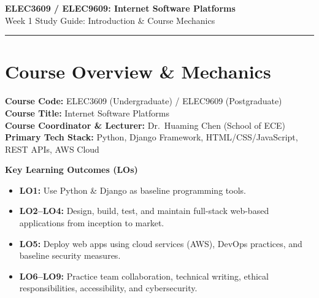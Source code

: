 \documentclass[8pt, a4paper]{article}
\begin{document}
\begin{center}
  {\LARGE\bfseries\color{accentblue} ELEC3609 / ELEC9609: Internet Software Platforms}\\[6pt]
  {\large Week 1 Study Guide: Introduction \& Course Mechanics}
\end{center}

\vspace{12pt}
\textcolor{rulegray}{\rule{\linewidth}{1pt}}
\vspace{6pt}

\section{Course Overview \& Mechanics}

\textbf{Course Code:} ELEC3609 (Undergraduate) / ELEC9609 (Postgraduate)\\
\textbf{Course Title:} Internet Software Platforms\\
\textbf{Course Coordinator \& Lecturer:} Dr.\ Huaming Chen (School of ECE)\\
\textbf{Primary Tech Stack:} Python, Django Framework, HTML/CSS/JavaScript, REST APIs, AWS Cloud

\medskip

\begin{conceptbox}
\textbf{Key Learning Outcomes (LOs)}
\begin{itemize}
  \item \textbf{LO1:} Use Python \& Django as baseline programming tools.
  \item \textbf{LO2--LO4:} Design, build, test, and maintain full-stack web-based applications from inception to market.
  \item \textbf{LO5:} Deploy web apps using cloud services (AWS), DevOps practices, and baseline security measures.
  \item \textbf{LO6--LO9:} Practice team collaboration, technical writing, ethical responsibilities, accessibility, and cybersecurity.
\end{itemize}
\end{conceptbox}

\medskip
\end{document}
